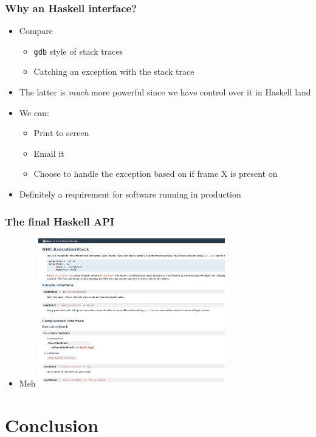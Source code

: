 \documentclass[11pt]{beamer} %
\begin{document}
  \begin{frame}
   \frametitle{Why an Haskell interface?}
  \begin{itemize}
   \item <1-> Compare
     \begin{itemize}
       \item \texttt{gdb} style of stack traces
       \item Catching an exception with the stack trace 
     \end{itemize}
   \item <2-> The latter is \emph{much} more powerful since we have control
     over it in Haskell land
   \item <3-> We can:
     \begin{itemize}
       \item Print to screen
       \item Email it
       \item Choose to handle the exception based on if frame X is present on
     \end{itemize}
   \item <4-> Definitely a requirement for software running in production
  \end{itemize}
  \end{frame}


  \begin{frame}
   \frametitle{The final Haskell API}
  \begin{itemize}
   \item <1-> Meh
     \includegraphics[width=3.2in]{fig/haddock-screenshot}
  \end{itemize}
  \end{frame}

\section{Conclusion}
\end{document}

